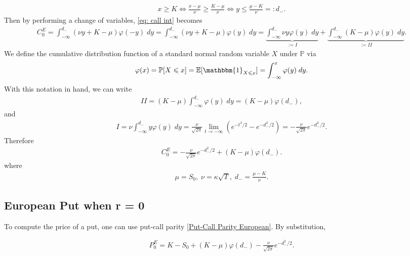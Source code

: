 \documentclass[reqno]{amsart}
\begin{document}
\begin{align}
	 x \ge K \Longleftrightarrow \frac{x-\mu}{\nu} \ge \frac{K - \mu}{\nu} \Longleftrightarrow y \le \frac{\mu - K}{\nu} =: d_-.
\end{align}
Then by performing a change of variables, \eqref{eq: call int} becomes 
\begin{align}
	 C^E_0 = \int_{-\infty}^{d_-} (\nu y + K - \mu) \varphi(-y) \; dy = \int_{-\infty}^{d_-} (\nu y + K - \mu) \varphi(y) \; dy = \underbrace{\int_{-\infty}^{d_-} \nu y \varphi(y) \; dy}_{:= I} + \underbrace{\int_{-\infty}^{d_-}  (K-\mu)\varphi(y) \; dy}_{:= II}.
\end{align}
We define the cumulative distribution function of a standard normal random variable $X$ under $\mathbb{P}$ via 
\begin{align}
	 \varphi(x) = \mathbb{P}[X \le x] = \E[ \mathbbm{1}_{X \le x}] = \int_{-\infty}^x \varphi(y) \; dy.
\end{align}
With this notation in hand, we can write 
\begin{align}
	 II = (K-\mu) \int_{-\infty}^{d_-} \varphi(y) \; dy = (K-\mu) \varphi(d_-),
\end{align}
and 
\begin{align}
	 I = \nu \int_{-\infty}^{d_-} y \varphi(y) \; dy =  \frac{\nu}{\sqrt{2\pi}} \lim_{t \to -\infty} (e^{-t^2/2} - e^{-d_-^2/2}) = -\frac{\nu}{\sqrt{2\pi}} e^{-d_-^2/2}.
\end{align}
Therefore 
\begin{align}
	 C^E_0 =  -\frac{\nu}{\sqrt{2\pi}} e^{-d_-^2/2} + (K-\mu) \varphi(d_-).
\end{align}
where 
\begin{align}
	 \mu = S_0, \; \nu = \kappa \sqrt{T}, \; d_- = \frac{\mu - K}{\nu}.
\end{align}

\subsection{European Put when r = 0}
To compute the price of a put, one can use put-call parity \eqref{Put-Call Parity European}. 
By substitution, 

\begin{align}
     P^E_0 = K - S_0 + (K-\mu) \varphi(d_-) - \frac{\nu}{\sqrt{2\pi}} e^{-d_-^2/2}.
\end{align}
\end{document}
